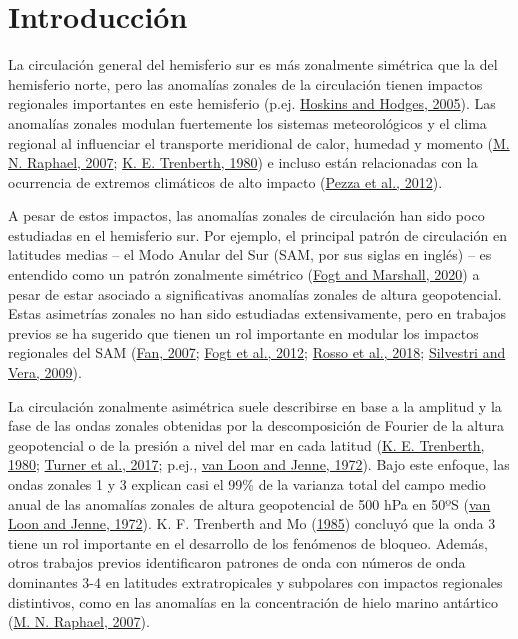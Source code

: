 \documentclass[12pt,oneside,a4paper]{reedthesis}
\begin{document}
  \listoftables

  \listoffigures


\mainmatter %
\pagestyle{fancyplain} %

\hypertarget{intro}{%
\chapter{Introducción}\label{intro}}

La circulación general del hemisferio sur es más zonalmente simétrica que la del hemisferio norte, pero las anomalías zonales de la circulación tienen impactos regionales importantes en este hemisferio (p.ej. \protect\hyperlink{ref-hoskins2005}{Hoskins and Hodges, 2005}).
Las anomalías zonales modulan fuertemente los sistemas meteorológicos y el clima regional al influenciar el transporte meridional de calor, humedad y momento (\protect\hyperlink{ref-raphael2007}{M. N. Raphael, 2007}; \protect\hyperlink{ref-trenberth1980a}{K. E. Trenberth, 1980}) e incluso están relacionadas con la ocurrencia de extremos climáticos de alto impacto (\protect\hyperlink{ref-pezza2012}{Pezza et al., 2012}).

A pesar de estos impactos, las anomalías zonales de circulación han sido poco estudiadas en el hemisferio sur.
Por ejemplo, el principal patrón de circulación en latitudes medias -- el Modo Anular del Sur (SAM, por sus siglas en inglés) -- es entendido como un patrón zonalmente simétrico (\protect\hyperlink{ref-fogt2020}{Fogt and Marshall, 2020}) a pesar de estar asociado a significativas anomalías zonales de altura geopotencial.
Estas asimetrías zonales no han sido estudiadas extensivamente, pero en trabajos previos se ha sugerido que tienen un rol importante en modular los impactos regionales del SAM (\protect\hyperlink{ref-fan2007}{Fan, 2007}; \protect\hyperlink{ref-fogt2012}{Fogt et al., 2012}; \protect\hyperlink{ref-rosso2018}{Rosso et al., 2018}; \protect\hyperlink{ref-silvestri2009}{Silvestri and Vera, 2009}).

La circulación zonalmente asimétrica suele describirse en base a la amplitud y la fase de las ondas zonales obtenidas por la descomposición de Fourier de la altura geopotencial o de la presión a nivel del mar en cada latitud (\protect\hyperlink{ref-trenberth1980a}{K. E. Trenberth, 1980}; \protect\hyperlink{ref-turner2017}{Turner et al., 2017}; p.ej., \protect\hyperlink{ref-vanloon1972}{van Loon and Jenne, 1972}).
Bajo este enfoque, las ondas zonales 1 y 3 explican casi el 99\% de la varianza total del campo medio anual de las anomalías zonales de altura geopotencial de 500 hPa en 50ºS (\protect\hyperlink{ref-vanloon1972}{van Loon and Jenne, 1972}).
K. F. Trenberth and Mo (\protect\hyperlink{ref-trenberth1985}{1985}) concluyó que la onda 3 tiene un rol importante en el desarrollo de los fenómenos de bloqueo.
Además, otros trabajos previos identificaron patrones de onda con números de onda dominantes 3-4 en latitudes extratropicales y subpolares con impactos regionales distintivos, como en las anomalías en la concentración de hielo marino antártico (\protect\hyperlink{ref-raphael2007}{M. N. Raphael, 2007}).
\end{document}
